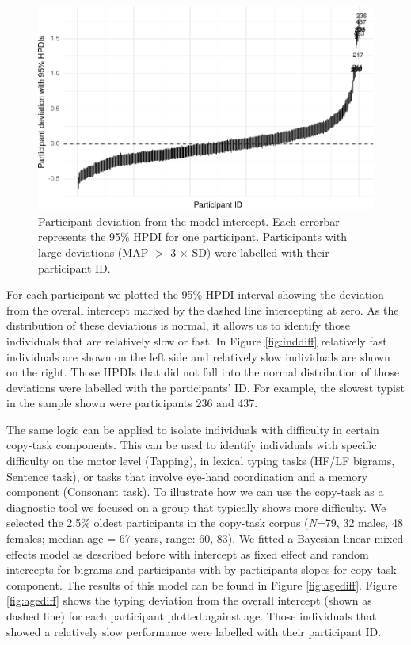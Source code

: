 \documentclass[,man,floatsintext]{apa6}
\begin{document}
\begin{figure}[!h]

{\centering \includegraphics{ct_files/figure-latex/unnamed-chunk-7-1} 

}

\caption{\label{fig:inddiff}Participant deviation from the model intercept. Each errorbar represents the 95\% HPDI for one participant. Participants with large deviations (MAP $>$ 3 $\times$ SD) were labelled with their participant ID.}\label{fig:unnamed-chunk-7}
\end{figure}

For each participant we plotted the 95\% HPDI interval showing the deviation from the overall intercept marked by the dashed line intercepting at zero. As the distribution of these deviations is normal, it allows us to identify those individuals that are relatively slow or fast. In Figure \ref{fig:inddiff} relatively fast individuals are shown on the left side and relatively slow individuals are shown on the right. Those HPDIs that did not fall into the normal distribution of those deviations were labelled with the participants' ID. For example, the slowest typist in the sample shown were participants 236 and 437.

The same logic can be applied to isolate individuals with difficulty in certain copy-task components. This can be used to identify individuals with specific difficulty on the motor level (Tapping), in lexical typing tasks (HF/LF bigrams, Sentence task), or tasks that involve eye-hand coordination and a memory component (Consonant task). To illustrate how we can use the copy-task as a diagnostic tool we focused on a group that typically shows more difficulty. We selected the 2.5\% oldest participants in the copy-task corpus (\textit{N}=79, 32 males, 48 females; median age = 67 years, range: 60, 83). We fitted a Bayesian linear mixed effects model as described before with intercept as fixed effect and random intercepts for bigrams and participants with by-participants slopes for copy-task component. The results of this model can be found in Figure \ref{fig:agediff}. Figure \ref{fig:agediff} shows the typing deviation from the overall intercept (shown as dashed line) for each participant plotted against age. Those individuals that showed a relatively slow performance were labelled with their participant ID.
\end{document}
